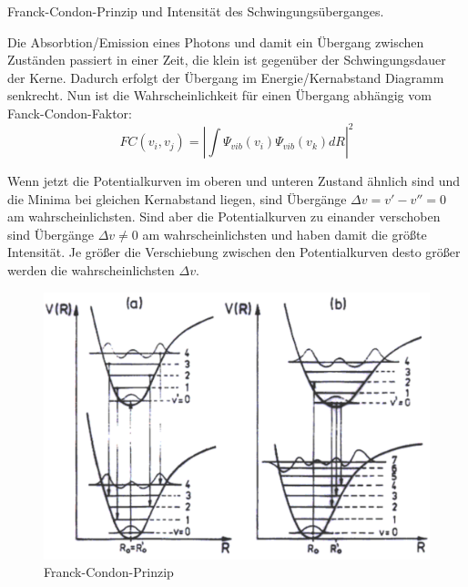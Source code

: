 \documentclass[a5paper,12pt,ngerman,print,grid=front]{kartei}
\begin{document}
	\begin{karte}{
		Franck-Condon-Prinzip und Intensität des Schwingungsüberganges.
		}
		
		Die Absorbtion/Emission eines Photons und damit ein Übergang zwischen Zuständen passiert in einer Zeit, die klein ist gegenüber der Schwingungsdauer der Kerne. Dadurch erfolgt der Übergang im Energie/Kernabstand Diagramm senkrecht. Nun ist die Wahrscheinlichkeit für einen Übergang abhängig vom Fanck-Condon-Faktor:
		$$  FC(v_i, v_j) = \left|   \int  \Psi_{ vib } (v_i)  \Psi_{ vib } (v_k)  dR    \right|^2   $$
		
		Wenn jetzt die Potentialkurven im oberen und unteren Zustand ähnlich sind und die Minima bei gleichen Kernabstand liegen, sind Übergänge $ \Delta v = v'- v''= 0 $ am wahrscheinlichsten. Sind aber die Potentialkurven zu einander verschoben sind Übergänge $ \Delta v \neq 0 $ am wahrscheinlichsten und haben damit die größte Intensität. Je größer die Verschiebung zwischen den Potentialkurven desto größer werden die wahrscheinlichsten $\Delta v$.
		
		\begin{figure}[htbp]
			\centering
			\includegraphics[width=0.4\linewidth]{./images/17_FCP}
			\caption{Franck-Condon-Prinzip}
			\label{fig:17_FCP}
		\end{figure}
		
		
	\end{karte}
\end{document}
